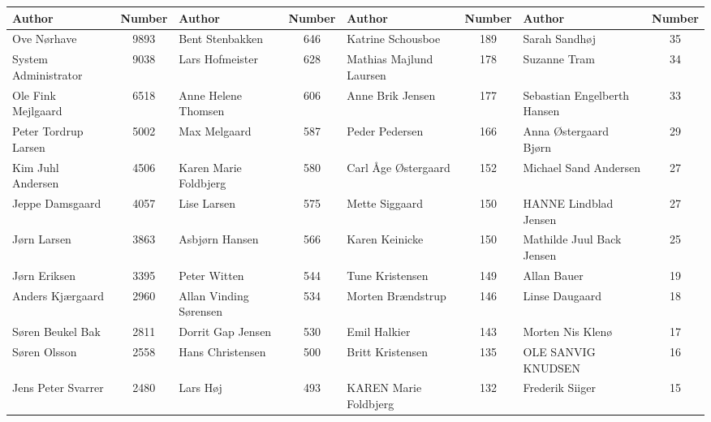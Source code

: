 \begin{table}[h]
	\centering
	\scriptsize
	\begin{tabular}{l|c|l|c|l|c|l|c}
		Author                & Number & Author                     & Number & Author                       & Number & Author                       & Number \\
		\toprule
		Ove Nørhave           &  9893  & Bent Stenbakken            &  646   & Katrine Schousboe            &  189   & Sarah Sandhøj                &   35   \\
		System Administrator  &  9038  & Lars Hofmeister            &  628   & Mathias Majlund Laursen      &  178   & Suzanne Tram                 &   34   \\
		Ole Fink Mejlgaard    &  6518  & Anne Helene Thomsen        &  606   & Anne Brik Jensen             &  177   & Sebastian Engelberth Hansen  &   33   \\
		Peter Tordrup Larsen  &  5002  & Max Melgaard               &  587   & Peder Pedersen               &  166   & Anna Østergaard Bjørn        &   29   \\
		Kim Juhl Andersen     &  4506  & Karen Marie Foldbjerg      &  580   & Carl Åge Østergaard          &  152   & Michael Sand Andersen        &   27   \\
		Jeppe Damsgaard       &  4057  & Lise Larsen                &  575   & Mette Siggaard               &  150   & HANNE Lindblad Jensen        &   27   \\
		Jørn Larsen           &  3863  & Asbjørn Hansen             &  566   & Karen Keinicke               &  150   & Mathilde Juul Back Jensen    &   25   \\
		Jørn Eriksen          &  3395  & Peter Witten               &  544   & Tune Kristensen              &  149   & Allan Bauer                  &   19   \\
		Anders Kjærgaard      &  2960  & Allan Vinding Sørensen     &  534   & Morten Brændstrup            &  146   & Linse Daugaard               &   18   \\
		Søren Beukel Bak      &  2811  & Dorrit Gap Jensen          &  530   & Emil Halkier                 &  143   & Morten Nis Klenø             &   17   \\
		Søren Olsson          &  2558  & Hans Christensen           &  500   & Britt Kristensen             &  135   & OLE SANVIG KNUDSEN           &   16   \\
		Jens Peter Svarrer    &  2480  & Lars Høj                   &  493   & KAREN Marie Foldbjerg        &  132   & Frederik Siiger              &   15   \\

\end{tabular}
\end{table}
